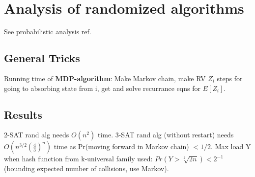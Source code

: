 \documentclass[oneside, article]{memoir}
\begin{document}
\chapter{Analysis of randomized algorithms}
See probabilistic analysis ref.

\section{General Tricks}
Running time of \textbf{MDP-algorithm}: Make Markov chain, make RV $Z_{i}$ steps for going to absorbing state from i, get and solve recurrance eqns for $E[Z_{i}]$.

\section{Results}
2-SAT rand alg needs $O(n^{2})$ time. 3-SAT rand alg (without restart) needs $O(n^{3/2}(\frac{4}{3})^{n})$ time as Pr(moving forward in Markov chain) $< 1/2$. Max load Y when hash function from k-universal family used: $Pr(Y > \sqrt[k]{2n})<2^{-1}$ (bounding expected number of collisions, use Markov).





\end{document}
